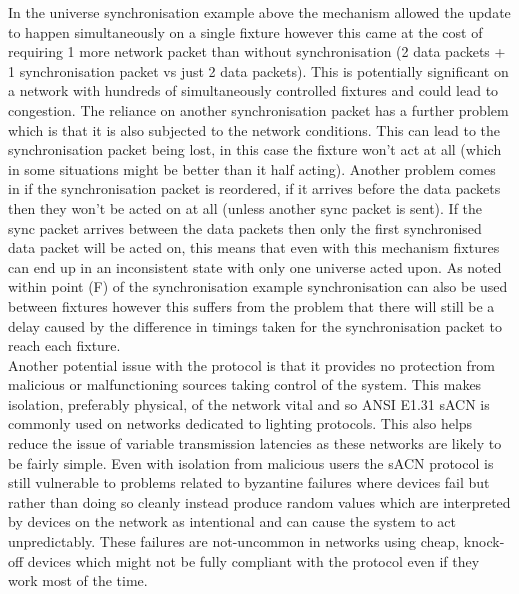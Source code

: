 \documentclass[11pt,a4paper]{article}
\begin{document}
In the universe synchronisation example above the mechanism allowed the update to happen simultaneously on a single fixture however this came at the cost of requiring 1 more network packet than without synchronisation (2 data packets + 1 synchronisation packet vs just 2 data packets). This is potentially significant on a network with hundreds of simultaneously controlled fixtures and could lead to congestion. The reliance on another synchronisation packet has a further problem which is that it is also subjected to the network conditions. This can lead to the synchronisation packet being lost, in this case the fixture won't act at all (which in some situations might be better than it half acting). Another problem comes in if the synchronisation packet is reordered, if it arrives before the data packets then they won't be acted on at all (unless another sync packet is sent). If the sync packet arrives between the data packets then only the first synchronised data packet will be acted on, this means that even with this mechanism fixtures can end up in an inconsistent state with only one universe acted upon. As noted within point (F) of the synchronisation example synchronisation can also be used between fixtures however this suffers from the problem that there will still be a delay caused by the difference in timings taken for the synchronisation packet to reach each fixture.\\

Another potential issue with the protocol is that it provides no protection from malicious or malfunctioning sources taking control of the system. This makes isolation, preferably physical, of the network vital and so ANSI E1.31 sACN is commonly used on networks dedicated to lighting protocols. This also helps reduce the issue of variable transmission latencies as these networks are likely to be fairly simple. Even with isolation from malicious users the sACN protocol is still vulnerable to problems related to byzantine failures where devices fail but rather than doing so cleanly instead produce random values which are interpreted by devices on the network as intentional and can cause the system to act unpredictably. These failures are not-uncommon in networks using cheap, knock-off devices which might not be fully compliant with the protocol even if they work most of the time.\\
\end{document}
